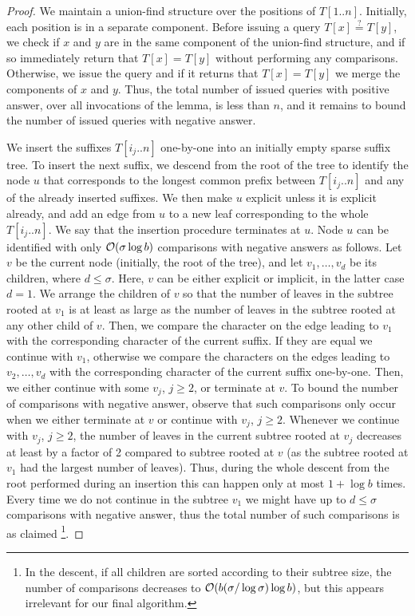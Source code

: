 \begin{proof}
We maintain a union-find structure over the positions of $T[1..n]$. Initially, each position is in a separate
component. Before issuing a query $T[x]\stackrel{?}{=}T[y]$, we check if $x$ and $y$ are in the same
component of the union-find structure, and if so immediately return that $T[x]=T[y]$
without performing any comparisons. 
Otherwise,
we issue the query and if it returns that $T[x]=T[y]$ we merge the components of $x$ and $y$.
Thus, the total number of issued queries with positive answer, over all invocations of the lemma,
is less than $n$, and it remains to bound the number of issued queries with negative answer.

We insert the suffixes $T[i_{j}..n]$ one-by-one into an initially empty sparse suffix tree.
To insert the next suffix, we descend from the root of the tree to identify the node $u$ that corresponds to
the longest common prefix between $T[i_{j}..n]$ and any of the already inserted suffixes. We then make $u$ explicit unless it is explicit already,
and add an edge from $u$ to a new leaf corresponding to the whole $T[i_{j}..n]$.
We say that the insertion procedure terminates at $u$.
Node $u$ can be identified with only $\mathcal{O}(\sigma\log b)$ comparisons with negative answers as follows.
Let $v$ be the current node (initially, the root of the tree), and let $v_{1},\ldots,v_{d}$ be its children,
where $d\leq \sigma$. Here, $v$ can be either explicit or implicit, in the latter case $d=1$.
We arrange the children of $v$ so that the number of leaves in the subtree
rooted at $v_{1}$ is at least as large as the number of leaves in the subtree rooted at any other
child of $v$. Then, we compare the character on the edge leading to $v_{1}$ with
the corresponding character of the current suffix. If they are equal we continue with $v_{1}$,
otherwise we compare the characters on the edges leading to $v_{2},\ldots,v_{d}$ with the
corresponding character of the current suffix one-by-one. Then, we either continue
with some $v_{j}$, $j\geq 2$, or terminate at $v$. To bound the number of comparisons with negative
answer, observe that such comparisons only occur when we either terminate at $v$ or continue
with $v_{j}$, $j\geq 2$. Whenever we continue with $v_{j}$, $j\geq 2$, the number of leaves
in the current subtree rooted at $v_j$ decreases at least by a factor of 2 compared to subtree rooted at $v$ (as the subtree rooted at $v_{1}$ had the largest
number of leaves). Thus, during the whole descent from the root performed during an insertion
this can happen only at most $1+\log b$ times. Every time we do not continue in the subtree $v_{1}$
we might have up to $d\leq \sigma$ comparisons with negative answer, thus the total number of such comparisons is as claimed%
\footnote{In the descent, if all children are sorted according to their subtree size, the number of comparisons decreases to $\mathcal{O}(b(\sigma/\log \sigma)\log b)$, but this appears irrelevant for our final algorithm.}.
\end{proof}



